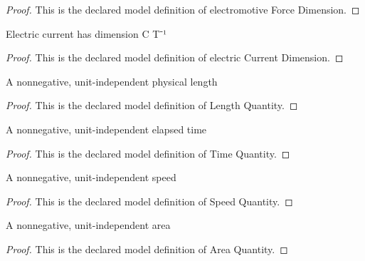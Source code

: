 \begin{proof}
  This is the declared model definition of electromotive Force Dimension.
\end{proof}
\begin{definition}
  \label{def:physics:phyx-mini-0918:phyxminiproblems-problemphyxmini0918-electriccurrentdimension}
  Electric current has dimension C T⁻¹
\end{definition}
\begin{proof}
  This is the declared model definition of electric Current Dimension.
\end{proof}
\begin{definition}
  \label{def:physics:phyx-mini-0918:phyxminiproblems-problemphyxmini0918-lengthquantity}
  A nonnegative, unit-independent physical length
\end{definition}
\begin{proof}
  This is the declared model definition of Length Quantity.
\end{proof}
\begin{definition}
  \label{def:physics:phyx-mini-0918:phyxminiproblems-problemphyxmini0918-timequantity}
  A nonnegative, unit-independent elapsed time
\end{definition}
\begin{proof}
  This is the declared model definition of Time Quantity.
\end{proof}
\begin{definition}
  \label{def:physics:phyx-mini-0918:phyxminiproblems-problemphyxmini0918-speedquantity}
  A nonnegative, unit-independent speed
\end{definition}
\begin{proof}
  This is the declared model definition of Speed Quantity.
\end{proof}
\begin{definition}
  \label{def:physics:phyx-mini-0918:phyxminiproblems-problemphyxmini0918-areaquantity}
  A nonnegative, unit-independent area
\end{definition}
\begin{proof}
  This is the declared model definition of Area Quantity.
\end{proof}
